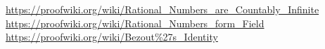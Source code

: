 \documentclass{article}
\begin{document}
\begin{thebibliography}{9}
 \url{https://proofwiki.org/wiki/Rational_Numbers_are_Countably_Infinite}
 \url{https://proofwiki.org/wiki/Rational_Numbers_form_Field}
 \url{https://proofwiki.org/wiki/Bezout\%27s_Identity}
\end{thebibliography}
\end{document}
